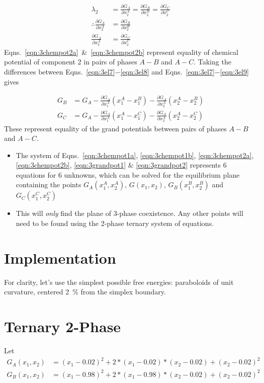 \documentclass[10pt]{article}
\begin{document}
\begin{align}
  \lambda_2 &= \frac{\partial G_A}{\partial x_2^A} = \frac{\partial G_B}{\partial x_2^B} = \frac{\partial G_C}{\partial x_2^C}\\
  \label{eqn:3chempot2a}
  \therefore \frac{\partial G_A}{\partial x_2^A} &= \frac{\partial G_B}{\partial x_2^B}\\
  \label{eqn:3chempot2b}
             \frac{\partial G_A}{\partial x_2^A} &= \frac{\partial G_C}{\partial x_2^C}
\end{align}
Eqns.~\ref{eqn:3chempot2a}~\&~\ref{eqn:3chempot2b} represent equality of chemical potential of component 2
in pairs of phases $A-B$ and $A-C$. Taking the differences between Eqns.~\ref{eqn:3el7}$-$\ref{eqn:3el8}
and Eqns.~\ref{eqn:3el7}$-$\ref{eqn:3el9} gives

\begin{align}
  \label{eqn:3grandpot1}
  G_B &= G_A - \frac{\partial G_A}{\partial x_1^A}(x_1^A - x_1^B) - \frac{\partial G_A}{\partial x_2^A}(x_2^A - x_2^B)\\
  \label{eqn:3grandpot2}
  G_C &= G_A - \frac{\partial G_A}{\partial x_1^A}(x_1^A - x_1^C) - \frac{\partial G_A}{\partial x_2^A}(x_2^A - x_2^C)
\end{align}
These represent equality of the grand potentials between pairs of phases $A-B$ and $A-C$.

\begin{itemize}
  \item The system of Eqns.~\ref{eqn:3chempot1a}, \ref{eqn:3chempot1b},
        \ref{eqn:3chempot2a}, \ref{eqn:3chempot2b}, \ref{eqn:3grandpot1} \&
        \ref{eqn:3grandpot2} represents 6 equations for 6 unknowns, which can
        be solved for the equilibrium plane containing the points
        $G_A(x_1^A,x_2^A)$, $G(x_1,x_2)$, $G_B(x_1^B,x_2^B)$ and $G_C(x_1^C,x_2^C)$
  \item This will \emph{only} find the plane of 3-phase coexistence. Any other
        points will need to be found using the 2-phase ternary system of equations.      
\end{itemize}

\section*{Implementation}

For clarity, let's use the simplest possible free energies: paraboloids of unit curvature,
centered \SI{2}{\percent} from the simplex boundary.

\section*{Ternary 2-Phase}

Let
\begin{align}
  \label{eqn:2Ga}
  G_A(x_1, x_2) &= (x_1 - 0.02)^2 + 2 * (x_1 - 0.02)*(x_2 - 0.02) + (x_2 - 0.02)^2\\
  \label{eqn:2Gb}
  G_B(x_1, x_2) &= (x_1 - 0.98)^2 + 2 * (x_1 - 0.98)*(x_2 - 0.02) + (x_2 - 0.02)^2
\end{align}
\end{document}
